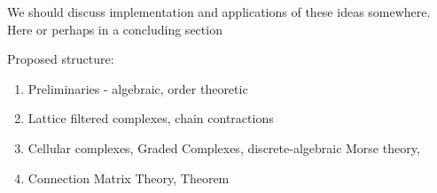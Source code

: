 {\color{blue}We should discuss implementation and applications of these ideas somewhere.
Here or perhaps in a concluding section}

Proposed structure:
\begin{enumerate}
\item Preliminaries - algebraic, order theoretic
\item Lattice filtered complexes, chain contractions
\item Cellular complexes, Graded Complexes, discrete-algebraic Morse theory, 
\item Connection Matrix Theory, Theorem
\end{enumerate}




